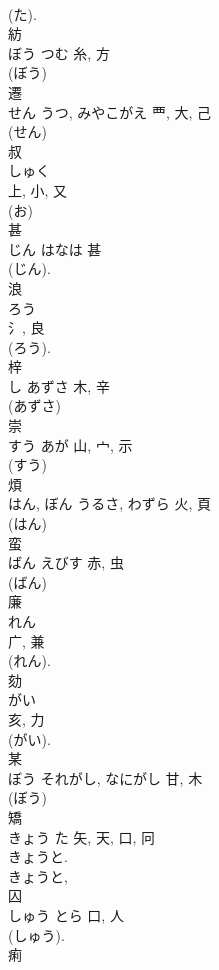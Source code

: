 \documentclass[8pt]{extreport}
\begin{document}
\begin{CJK}{UTF8}{min}
\\	(た). 
\\	紡	
\\	ぼう	つむ	糸, 方	
\\	(ぼう) 
\\	遷	
\\	せん	うつ, みやこがえ	覀, 大, 己		
\\	(せん) 
\\	叔	
\\	しゅく	
\\	上, 小, 又	
\\	(お) 
\\	甚	
\\	じん	はなは	甚	
\\	(じん). 
\\	浪	
\\	ろう	
\\	氵, 良	
\\	(ろう).	
\\	梓	
\\	し	あずさ	木, 辛	
\\	(あずさ) 
\\	崇	
\\	すう	あが	山, 宀, 示	
\\	(すう) 
\\	煩	
\\	はん, ぼん	うるさ, わずら	火, 頁	
\\	(はん) 
\\	蛮	
\\	ばん	えびす	赤, 虫	
\\	(ばん) 
\\	廉	
\\	れん	
\\	广, 兼	
\\	(れん). 
\\	劾	
\\	がい	
\\	亥, 力	
\\	(がい). 
\\	某	
\\	ぼう	それがし, なにがし	甘, 木	
\\	(ぼう) 
\\	矯	
\\	きょう	た	矢, 天, 口, 冋	
\\	きょうと. 
\\	きょうと, 
\\	囚	
\\	しゅう	とら	口, 人	
\\	(しゅう). 
\\	痢	

\end{CJK}
\end{document}
